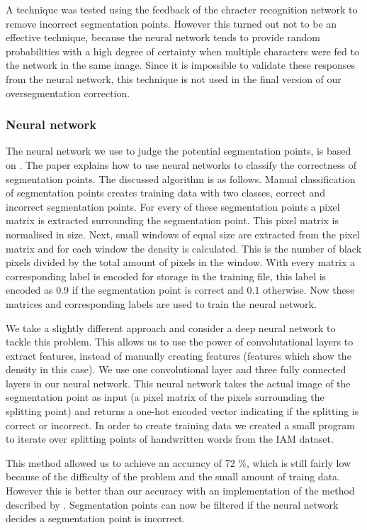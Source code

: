 \documentclass{article}
\begin{document}
A technique was tested using the feedback of the chracter recognition network to remove incorrect segmentation points.
However this turned out not to be an effective technique, because the neural network tends to provide random probabilities with a high degree of certainty when multiple characters were fed to the network in the same image.
Since it is impossible to validate these responses from the neural network, this technique is not used in the final version of our oversegmentation correction.

\subsubsection{Neural network}
The neural network we use to judge the potential segmentation points, is based on \cite{evalsplitpointsnn}. The paper explains how to use neural networks to classify the correctness of segmentation points. The discussed algorithm is as follows. Manual classification of segmentation points creates training data with two classes, correct and incorrect segmentation points.
For every of these segmentation points a pixel matrix is extracted surrounding the segmentation point. This pixel matrix is normalised in size.
Next, small windows of equal size are extracted from the pixel matrix and for each window the density is calculated. This is the number of black pixels divided by the total amount of pixels in the window.
With every matrix a corresponding label is encoded for storage in the training file, this label is encoded as 0.9 if the segmentation point is correct and 0.1 otherwise. Now these matrices and corresponding labels are used to train the neural network.

We take a slightly different approach and consider a deep neural network to tackle this problem. This allows us to use the power of convolutational layers to extract features, instead of manually creating features (features which show the density in this case).
We use one convolutional layer and three fully connected layers in our neural network. This neural network takes the actual image of the segmentation point as input (a pixel matrix of the pixels surrounding the splitting point) and returns a one-hot encoded vector indicating if the splitting is correct or incorrect. In order to create training data we created a small program to iterate over splitting points of handwritten words from the IAM dataset. \cite{iam}

This method allowed us to achieve an accuracy of 72 \%, which is still fairly low because of the difficulty of the problem and the small amount of traing data. However this is better than our accuracy with an implementation of the method described by \cite{evalsplitpointsnn}.
Segmentation points can now be filtered if the neural network decides a segmentation point is incorrect.
\end{document}
